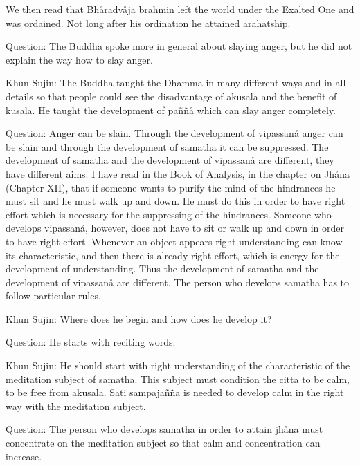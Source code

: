 \documentclass[12pt,twoside]{article}
\begin{document}
We then read that Bh{\aa}radv{\aa}ja brahmin left the world under the
Exalted One and was ordained. Not long after his ordination he attained
arahatship. 

Question: The Buddha spoke more in general about slaying anger, but he
did not explain the way how to slay anger. 

Khun Sujin: The Buddha taught the Dhamma in many different ways and in
all details so that people could see the disadvantage of akusala and
the benefit of kusala. He taught the development of pa\~n\~n{\aa} which
can slay anger completely. 

Question: Anger can be slain. Through the development of vipassan{\aa}
anger can be slain and through the development of samatha it can be
suppressed. The development of samatha and the development of
vipassan{\aa} are different, they have different aims. I have read in
the {\textasciigrave}{\textasciigrave}Book of
Analysis{\textquotesingle}{\textquotesingle}, in the chapter on
Jh{\aa}na (Chapter XII), that if someone wants to purify the mind of
the hindrances he must sit and he must walk up and down. He must do
this in order to have right effort which is necessary for the
suppressing of the hindrances. Someone who develops vipassan{\aa},
however, does not have to sit or walk up and down in order to have
right effort. Whenever an object appears right understanding can know
its characteristic, and then there is already right effort, which is
energy for the development of understanding. Thus the development of
samatha and the development of vipassan{\aa} are different. The person
who develops samatha has to follow particular rules. 

Khun Sujin: Where does he begin and how does he develop it?

Question: He starts with reciting words. 

Khun Sujin: He should start with right understanding of the
characteristic of the meditation subject of samatha. This subject must
condition the citta to be calm, to be free from akusala. Sati
sampaja\~n\~na is needed to develop calm in the right way with the
meditation subject. 

Question: The person who develops samatha in order to attain jh{\aa}na
must concentrate on the meditation subject so that calm and
concentration can increase. 
\end{document}
